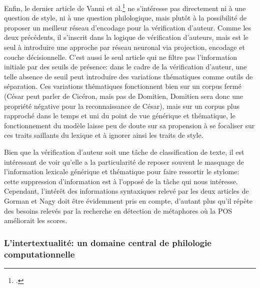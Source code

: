 Enfin, le dernier article de Vanni et al.\footcite{vanni_textual_2018} ne s'intéresse pas directement ni à une question de style, ni à une question philologique, mais plutôt à la possibilité de proposer un meilleur réseau d'encodage pour la vérification d'auteur. Comme les deux précédents, il s'inscrit dans la logique de vérification d'auteurs, mais est le seul à introduire une approche par réseau neuronal via projection, encodage et couche décisionnelle. C'est aussi le seul article qui ne filtre pas l'information initiale par des seuils de présence: dans le cadre de la vérification d'auteur, une telle absence de seuil peut introduire des variations thématiques comme outils de séparation. Ces variations thématiques fonctionnent bien sur un corpus fermé (César peut parler de Cicéron, mais pas de Domitien, Domitien sera donc une propriété négative pour la reconnaissance de César), mais sur un corpus plus rapproché dans le temps et uni du point de vue générique et thématique, le fonctionnement du modèle laisse peu de doute sur sa propension à se focaliser sur ces traits saillants du lexique et à ignorer ainsi les traits de style.

Bien que la vérification d'auteur soit une tâche de classification de texte, il est intéressant de voir qu'elle a la particularité de reposer souvent le masquage de l'information lexicale générique et thématique pour faire ressortir le stylome: cette suppression d'information est à l'opposé de la tâche qui nous intéresse. Cependant, l'intérêt des informations syntaxiques relevé par les deux articles de Gorman et Nagy doit être évidemment pris en compte, d'autant plus qu'il répète des besoins relevés par la recherche en détection de métaphores où la POS améliorait les scores.

\subsubsection{L'intertextualité: un domaine central de philologie computationnelle}


